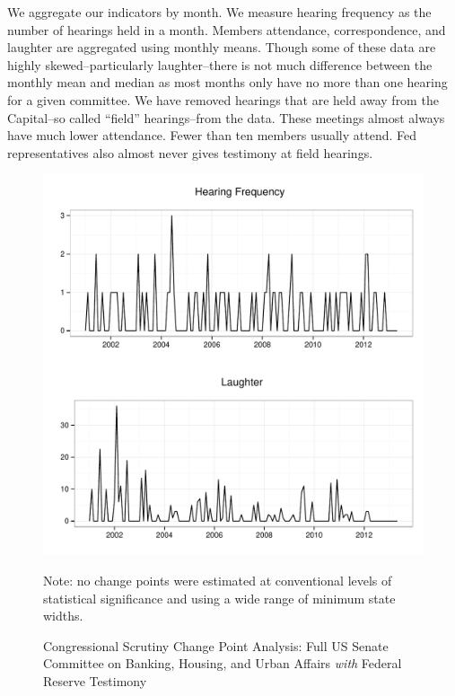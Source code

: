 \documentclass[a4paper]{article}\usepackage[]{graphicx}\usepackage[]{color}
\newenvironment{knitrout}{}{} %
\begin{document}
We aggregate our indicators by month. We measure hearing frequency as the number of hearings held in a month. Members attendance, correspondence, and laughter are aggregated using monthly means. Though some of these data are highly skewed--particularly laughter--there is not much difference between the monthly mean and median as most months only have no more than one hearing for a given committee. We have removed hearings that are held away from the Capital--so called ``field'' hearings--from the data. These meetings almost always have much lower attendance. Fewer than ten members usually attend. Fed representatives also almost never gives testimony at field hearings.

\begin{figure}
    \caption{Congressional Scrutiny Change Point Analysis: Full US Senate Committee on Banking, Housing, and Urban Affairs \emph{with} Federal Reserve Testimony}
    \label{fig:SenateFedCP}
\begin{knitrout}
\color{fgcolor}

{\centering \includegraphics[width=0.8\linewidth]{figure/ScrutinySenate} 

}



\end{knitrout}
{\scriptsize{Note: no change points were estimated at conventional levels of statistical significance and using a wide range of minimum state widths.}}
\end{figure}
\end{document}
